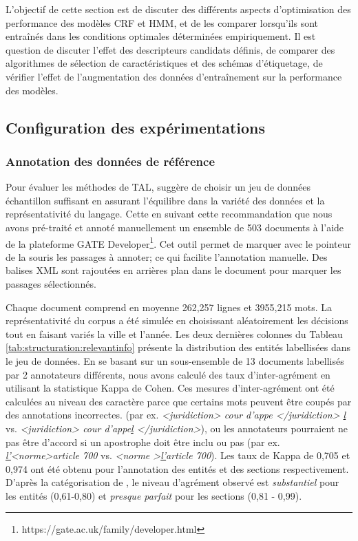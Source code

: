 L'objectif de cette section est de discuter des différents aspects d'optimisation des performance des modèles CRF et HMM, et de les comparer lorsqu'ils sont entraînés dans les conditions optimales déterminées empiriquement. Il est question de discuter l'effet des descripteurs candidats définis, de comparer des algorithmes de sélection de caractéristiques et des schémas d'étiquetage, de vérifier l'effet de l'augmentation des données d'entraînement sur la performance des modèles.

\label{sec:structuration:experimentations}
\subsection{Configuration des expérimentations}
\subsubsection{Annotation des données de référence}
Pour évaluer les méthodes de TAL, \citet{xiao2010corpuscreation} suggère de choisir un jeu de données échantillon suffisant en assurant l'équilibre dans la variété des données et la représentativité du langage. Cette en suivant cette recommandation que nous avons pré-traité et annoté manuellement un ensemble de 503 documents à l'aide de la plateforme GATE Developer\footnote{https://gate.ac.uk/family/developer.html}. Cet outil permet de marquer avec le pointeur de la souris les passages à annoter; ce qui facilite l'annotation manuelle. Des balises XML sont rajoutées en arrières plan dans le document pour marquer les passages sélectionnés.

Chaque document comprend en moyenne 262,257 lignes et 3955,215 mots. La représentativité du corpus a été simulée en choisissant aléatoirement les décisions tout en faisant variés la ville et l'année. Les deux dernières colonnes du Tableau \ref{tab:structuration:relevantinfo} présente la distribution des entités labellisées dans le jeu de données. En se basant sur un sous-ensemble de 13 documents labellisés par 2 annotateurs différents, nous avons calculé des taux d'inter-agrément en utilisant la statistique Kappa de Cohen. Ces mesures d'inter-agrément ont été calculées au niveau des caractère parce que certains mots peuvent être coupés par des annotations incorrectes. (par ex. \textit{<juridiction> cour d'appe </juridiction> \underline{l}} vs. \textit{<juridiction> cour d'appe\underline{l} </juridiction>}), ou les annotateurs pourraient ne pas être d'accord si un apostrophe doit être inclu ou pas (par ex. \textit{ \underline{l'}<norme>article 700} vs. \textit{ <norme >\underline{l'}article 700}). Les taux de Kappa de 0,705 et 0,974 ont été obtenu pour l'annotation des entités et des sections respectivement. D'après la catégorisation de \citet{viera2005kappa}, le niveau d'agrément observé est \textit{substantiel} pour les entités (0,61-0,80) et \textit{presque parfait} pour les sections (0,81 - 0,99).

